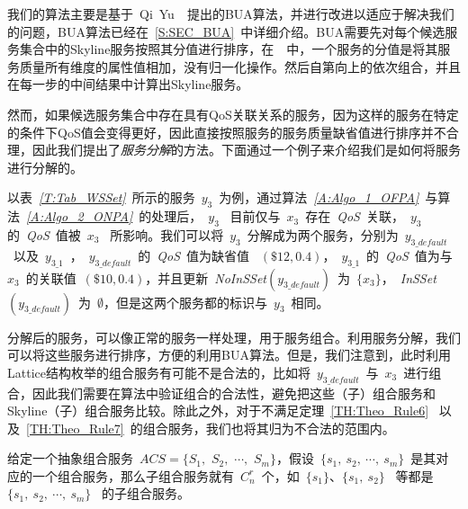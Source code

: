 我们的算法主要是基于~Qi~Yu~\cite{yu2013efficient}~提出的BUA算法，并进行改进以适应于解决我们的问题，BUA算法已经在~\ref{S:SEC_BUA}~中详细介绍。BUA需要先对每个候选服务集合中的Skyline服务按照其分值进行排序，在~\cite{yu2013efficient}~中，一个服务的分值是将其服务质量所有维度的属性值相加，没有归一化操作。然后自第向上的依次组合，并且在每一步的中间结果中计算出Skyline服务。

然而，如果候选服务集合中存在具有QoS关联关系的服务，因为这样的服务在特定的条件下QoS值会变得更好，因此直接按照服务的服务质量缺省值进行排序并不合理，因此我们提出了\emph{服务分解}的方法。下面通过一个例子来介绍我们是如何将服务进行分解的。

\begin{example}[服务分解]

以表~\emph{\ref{T:Tab_WSSet}}~所示的服务~$y_{3}$~为例，通过算法~\emph{\ref{A:Algo_1_OFPA}}~与算法~\emph{\ref{A:Algo_2_ONPA}}~的处理后，~$y_{3}$~ 目前仅与~$x_{3}$~存在~\emph{QoS}~关联，~$y_{3}$~ 的~\emph{QoS}~值被~$x_{3}$~ 所影响。我们可以将~$y_{3}$~分解成为两个服务，分别为~$y_{3\_default}$~以及~$y_{3\_1}$~，~$y_{3\_default}$~的~\emph{QoS}~值为缺省值~ $(\$12,0.4)$，~$y_{3\_1}$~的~\emph{QoS}~值为与~$x_{3}$~的关联值~$(\$10,0.4)$，并且更新~\emph{NoInSSet}$(y_{3\_default})$~为~$\{x_{3}\}$，~\emph{InSSet}$(y_{3\_default})$~为~$\emptyset$，但是这两个服务都的标识与~$y_{3}$~相同。

\end{example}

分解后的服务，可以像正常的服务一样处理，用于服务组合。利用服务分解，我们可以将这些服务进行排序，方便的利用BUA算法。但是，我们注意到，此时利用Lattice结构枚举的组合服务有可能不是合法的，比如将~$y_{3\_default}$~与~$x_{3}$~进行组合，因此我们需要在算法中验证组合的合法性，避免把这些（子）组合服务和Skyline（子）组合服务比较。除此之外，对于不满足定理~\ref{TH:Theo_Rule6}~ 以及~\ref{TH:Theo_Rule7}~的组合服务，我们也将其归为不合法的范围内。

\begin{definition}

给定一个抽象组合服务~$ACS=\{S_{1},$ $S_{2},$ $\cdots,$ $S_{m}\}$，假设~$\{s_{1},\ s_{2},\ \cdots,\ s_{m}\}$~是其对应的一个组合服务，那么子组合服务就有~$C_n^r$~个，如~$\{s_{1}\}$、$\{s_{1},\ s_{2}\}$~ 等都是~$\{s_{1},\ s_{2},\ \cdots,\ s_{m}\}$~ 的子组合服务。

\end{definition}


